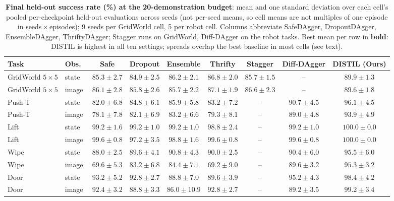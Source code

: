 \documentclass[letterpaper]{article} %
\begin{document}
\begin{table}[t]
\centering
\small
\setlength{\tabcolsep}{4pt}
\caption{\textbf{Final held-out success rate (\%) at the 20-demonstration
budget}: mean and one standard deviation over each cell's pooled
per-checkpoint held-out evaluations across seeds (not per-seed means, so
cell means are not multiples of one episode in
seeds\,$\times$\,episodes); 9 seeds per GridWorld cell, 5 per robot cell.
Columns abbreviate SafeDAgger, DropoutDAgger, EnsembleDAgger,
ThriftyDAgger; Stagger runs on GridWorld, Diff-DAgger on the robot tasks.
Best mean per row in \textbf{bold}: DISTIL is highest in all ten settings;
spreads overlap the best baseline in most cells (see text).}
\label{tab:main}
\begin{tabular}{llccccccc}
\toprule
Task & Obs.\ & Safe & Dropout & Ensemble & Thrifty & Stagger & Diff-DAgger & DISTIL (Ours) \\
\midrule
GridWorld $5{\times}5$ & state & $85.3 \pm 2.7$ & $84.9 \pm 2.5$ & $86.2 \pm 2.1$ & $86.8 \pm 2.0$ & $85.7 \pm 1.5$ & -- &$\mathbf{89.9 \pm 1.3}$ \\
GridWorld $5{\times}5$ & image & $86.1 \pm 2.8$ & $85.8 \pm 2.6$ & $85.7 \pm 2.2$ & $87.1 \pm 1.9$ & $86.6 \pm 2.3$ & -- &$\mathbf{89.6 \pm 1.8}$ \\
\addlinespace
Push-T & state & $82.0 \pm 6.8$ & $84.8 \pm 6.1$ & $85.9 \pm 5.8$ & $83.2 \pm 7.2$ & -- &$90.7 \pm 4.5$ & $\mathbf{96.1 \pm 4.5}$ \\
Push-T & image & $78.1 \pm 7.8$ & $82.1 \pm 6.9$ & $83.2 \pm 6.6$ & $79.3 \pm 8.1$ & -- &$89.0 \pm 4.8$ & $\mathbf{93.9 \pm 4.9}$ \\
\addlinespace
Lift & state & $99.2 \pm 1.6$ & $99.2 \pm 1.0$ & $99.2 \pm 1.0$ & $98.8 \pm 2.4$ & -- &$99.2 \pm 1.0$ & $\mathbf{100.0 \pm 0.0}$ \\
Lift & image & $99.6 \pm 0.8$ & $97.2 \pm 3.5$ & $98.8 \pm 1.6$ & $99.6 \pm 0.8$ & -- &$99.6 \pm 0.8$ & $\mathbf{100.0 \pm 0.0}$ \\
\addlinespace
Wipe & state & $88.0 \pm 2.5$ & $89.6 \pm 4.1$ & $90.8 \pm 4.3$ & $90.0 \pm 2.5$ & -- &$90.4 \pm 6.0$ & $\mathbf{95.5 \pm 6.0}$ \\
Wipe & image & $69.6 \pm 5.3$ & $83.2 \pm 6.8$ & $84.4 \pm 7.1$ & $69.2 \pm 9.0$ & -- &$89.6 \pm 3.2$ & $\mathbf{95.3 \pm 3.2}$ \\
\addlinespace
Door & state & $93.2 \pm 5.2$ & $92.8 \pm 2.7$ & $88.8 \pm 7.0$ & $89.6 \pm 3.9$ & -- &$95.2 \pm 4.3$ & $\mathbf{98.4 \pm 4.2}$ \\
Door & image & $92.4 \pm 3.2$ & $88.8 \pm 3.3$ & $86.0 \pm 10.9$ & $92.8 \pm 2.7$ & -- &$89.2 \pm 3.5$ & $\mathbf{99.2 \pm 3.4}$ \\
\bottomrule
\end{tabular}
\end{table}
\end{document}
